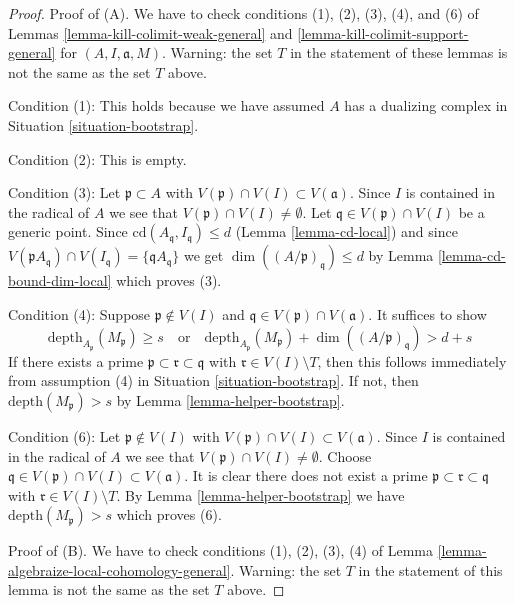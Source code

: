 \begin{proof}
\medskip\noindent
Proof of (A). We have to check conditions (1), (2), (3), (4), and (6)
of Lemmas \ref{lemma-kill-colimit-weak-general} and
\ref{lemma-kill-colimit-support-general} for
$(A, I, \mathfrak a, M)$. Warning: the set $T$ in the statement of
these lemmas is not the same as the set $T$ above.

\medskip\noindent
Condition (1): This holds because we have assumed $A$ has a dualizing complex in
Situation \ref{situation-bootstrap}.

\medskip\noindent
Condition (2): This is empty.

\medskip\noindent
Condition (3): Let $\mathfrak p \subset A$ with
$V(\mathfrak p) \cap V(I) \subset V(\mathfrak a)$.
Since $I$ is contained in the radical of $A$ we see
that $V(\mathfrak p) \cap V(I) \not = \emptyset$.
Let $\mathfrak q \in V(\mathfrak p) \cap V(I)$ be a generic point.
Since $\text{cd}(A_\mathfrak q, I_\mathfrak q) \leq d$
(Lemma \ref{lemma-cd-local}) and since
$V(\mathfrak p A_\mathfrak q) \cap V(I_\mathfrak q) =
\{\mathfrak q A_\mathfrak q\}$ we get
$\dim((A/\mathfrak p)_\mathfrak q) \leq d$ by
Lemma \ref{lemma-cd-bound-dim-local} which proves (3).

\medskip\noindent
Condition (4): Suppose $\mathfrak p \not \in V(I)$ and
$\mathfrak q \in V(\mathfrak p) \cap V(\mathfrak a)$.
It suffices to show
$$
\text{depth}_{A_\mathfrak p}(M_\mathfrak p) \geq s
\quad\text{or}\quad
\text{depth}_{A_\mathfrak p}(M_\mathfrak p) +
\dim((A/\mathfrak p)_\mathfrak q) > d + s
$$
If there exists a prime $\mathfrak p \subset \mathfrak r \subset \mathfrak q$
with $\mathfrak r \in V(I) \setminus T$, then this follows
immediately from assumption (4) in Situation \ref{situation-bootstrap}.
If not, then $\text{depth}(M_\mathfrak p) > s$ by
Lemma \ref{lemma-helper-bootstrap}.

\medskip\noindent
Condition (6): Let $\mathfrak p \not \in V(I)$ with
$V(\mathfrak p) \cap V(I) \subset V(\mathfrak a)$.
Since $I$ is contained in the radical of $A$ we see
that $V(\mathfrak p) \cap V(I) \not = \emptyset$.
Choose $\mathfrak q \in V(\mathfrak p) \cap V(I) \subset V(\mathfrak a)$.
It is clear there does not exist a prime
$\mathfrak p \subset \mathfrak r \subset \mathfrak q$
with $\mathfrak r \in V(I) \setminus T$.
By Lemma \ref{lemma-helper-bootstrap} we have
$\text{depth}(M_\mathfrak p) > s$ which proves (6).

\medskip\noindent
Proof of (B). We have to check conditions (1), (2), (3), (4) of
Lemma \ref{lemma-algebraize-local-cohomology-general}. Warning:
the set $T$ in the statement of
this lemma is not the same as the set $T$ above.


\end{proof}
